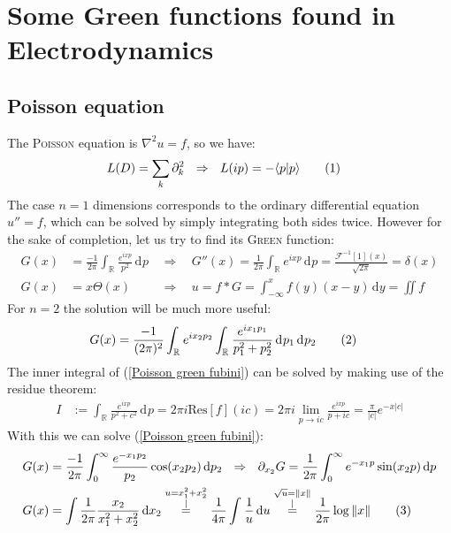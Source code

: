 \documentclass[a4paper,12pt]{article}
\newcommand\numberthis{\addtocounter{equation}{1}\tag{\theequation}}
\newcommand{\kom}{}
\newcommand{\brak}{}
\newcommand{\intx}{}
\newcommand{\intr}{}
\newcommand{\tecxt}{}
\begin{document}
\section{Some Green functions found in Electrodynamics}
\subsection{Poisson equation}
The \textsc{Poisson} equation is $\nabla^2u=f$, so we have:
\begin{align*}
L(D)&=\sum_k\partial_k^2\ \ \Rightarrow\ \ L(ip)=-\brak\langle {p}| {p}\rangle\numberthis\label{Poisson L operator}
\end{align*}
The case $n=1$ dimensions corresponds to the ordinary differential equation $u''=f$, which can be solved by simply integrating both sides twice. However for the sake of completion, let us try to find its \textsc{Green} function:
\begin{align*}
G(x)&=\frac{-1}{2\pi}\intr\int_{\mathbb{R}^{ }}{\frac{e^{ixp}}{p^2}}\,\mathrm{d}^{ }p\ \ &\Rightarrow &\ \ G''(x)=\frac{1}{2\pi}\intr\int_{\mathbb{R}^{ }}{e^{ixp}}\,\mathrm{d}^{ }p=\frac{\mathcal{F}^{-1}[1](x)}{\sqrt{2\pi}}=\delta(x)\\
G(x)&=x\Theta(x)\ \ &\Rightarrow &\ \ u=f\ast G=\intx\int_{-\infty}^{x}f(y)(x-y)\,\mathrm{d}y=\iint f
\end{align*}
For $n=2$ the solution will be much more useful:
\begin{align*}
G(x)&=\frac{-1}{(2\pi)^2}\intr\int_{\mathbb{R}^{ }}{e^{ix_2p_2}\intr\int_{\mathbb{R}^{ }}{\frac{e^{ix_1p_1}}{p_1^2+p_2^2}}\,\mathrm{d}^{ }p_1}\,\mathrm{d}^{ }p_2\numberthis\label{Poisson green fubini}
\end{align*}
The inner integral of (\ref{Poisson green fubini}) can be solved by making use of the residue theorem:
\begin{align*}
I&:=\intr\int_{\mathbb{R}^{ }}{\frac{e^{ixp}}{p^2+c^2}}\,\mathrm{d}^{ }p=2\pi i\tecxt\text{Res}[f](ic)=2\pi i\lim_{p\rightarrow ic}\frac{e^{ixp}}{p+ic}=\frac{\pi}{|c|}e^{-x|c|}
\end{align*}
With this we can solve (\ref{Poisson green fubini}):
\begin{align*}
G(x)&=\frac{-1}{2\pi}\intx\int_{0}^{\infty}\frac{e^{-x_1p_2}}{p_2}\cos(x_2p_2)\,\mathrm{d}p_2\ \ \Rightarrow\ \ \partial_{x_2}G=\frac{1}{2\pi}\intx\int_{0}^{\infty}e^{-x_1p}\sin(x_2p)\,\mathrm{d}p\\
G(x)&=\int\frac{1}{2\pi}\frac{x_2}{x_1^2+x_2^2}\,\mathrm{d}x_2\kom\overset{\substack{{u=x_1^2+x_2^2} \\ |}}{=}\frac{1}{4\pi}\intx\int_{ }^{ }\frac{1}{u}\,\mathrm{d}u\kom\overset{\substack{{\sqrt{u}=\|x\|} \\ |}}{=}\frac{1}{2\pi}\log\|x\|  \numberthis\label{Poisson green n2}
\end{align*}
\end{document}
